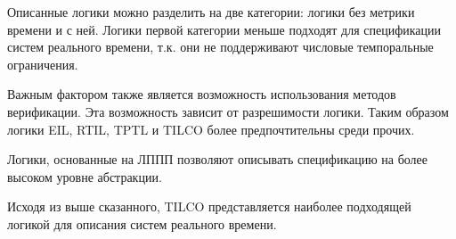 		Описанные логики можно разделить на две категории: логики без метрики времени и с ней.
		Логики первой категории меньше подходят для спецификации систем реального времени, т.к. они не поддерживают числовые темпоральные ограничения.
		
		Важным фактором также является возможность использования методов верификации.
		Эта возможность зависит от разрешимости логики. Таким образом логики EIL, RTIL, TPTL и TILCO более предпочтительны среди прочих.
		
		Логики, основанные на ЛППП позволяют описывать спецификацию на более высоком уровне абстракции.
		
		Исходя из выше сказанного, TILCO представляется наиболее подходящей логикой для описания систем реального времени.